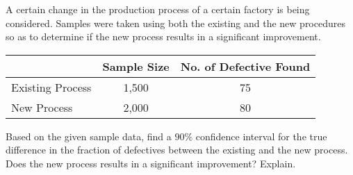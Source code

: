 \documentclass[letterpaper,10pt,addpoints]{exam}
\begin{document}
\begin{questions}


\question[10]
A certain change in the production process of a certain factory is being considered. Samples were taken using both the existing and the new procedures so as to determine if the new process results in a significant improvement.

\begin{tabular}{|l|c|c|}
\hline & Sample Size & No. of Defective Found \\
\hline Existing Process & 1,500 & 75 \\
\hline New Process & 2,000 & 80 \\
\hline
\end{tabular}

Based on the given sample data, find a $90 \%$ confidence interval for the true difference in the fraction of defectives between the existing and the new process. Does the new process results in a significant improvement? Explain.





\end{questions}
\end{document}
